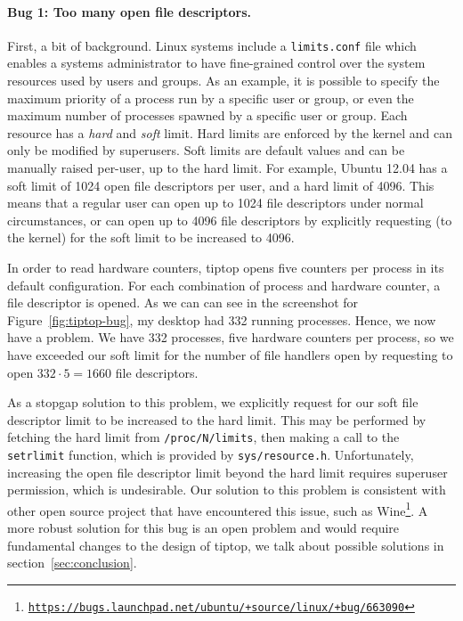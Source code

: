 \paragraph{Bug 1: Too many open file descriptors.}
First, a bit of background. Linux systems include a \texttt{limits.conf} file which enables a systems administrator to have fine-grained control over the system resources used by users and groups.
As an example, it is possible to specify the maximum priority of a process run by a specific user or group, or even the maximum number of processes spawned by a specific user or group. Each resource has a \emph{hard} and \emph{soft} limit. Hard limits are enforced by the kernel and can only be modified by superusers. Soft limits are default values and can be manually raised per-user, up to the hard limit.
For example, Ubuntu 12.04 has a soft limit of 1024 open file descriptors per user, and a hard limit of 4096.
This means that a regular user can open up to 1024 file descriptors under normal circumstances, or can open up to 4096 file descriptors by explicitly requesting (to the kernel) for the soft limit to be increased to 4096.

In order to read hardware counters, tiptop opens five counters per process in its default configuration.
For each combination of process and hardware counter, a file descriptor is opened.
As we can can see in the screenshot for Figure~\ref{fig:tiptop-bug}, my desktop had 332 running processes.
Hence, we now have a problem.
We have 332 processes, five hardware counters per process, so we have exceeded our soft limit for the number of file handlers open by requesting to open $332\cdot 5 = 1660$ file descriptors.

As a stopgap solution to this problem, we explicitly request for our soft file descriptor limit to be increased to the hard limit. This may be performed by fetching the hard limit from \texttt{/proc/N/limits}, then making a call to the \texttt{setrlimit} function, which is provided by \texttt{sys/resource.h}.
Unfortunately, increasing the open file descriptor limit beyond the hard limit requires superuser permission, which is undesirable.
Our solution to this problem is consistent with other open source project that have encountered this issue, such as Wine\footnote{\texttt{\url{https://bugs.launchpad.net/ubuntu/+source/linux/+bug/663090}}}.
A more robust solution for this bug is an open problem and would require fundamental changes to the design of tiptop, we talk about possible solutions in section~\ref{sec:conclusion}.

